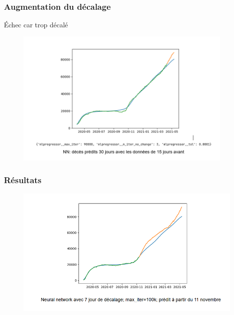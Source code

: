 \documentclass{beamer}
\begin{document}
\begin{frame}
	\frametitle{Augmentation du décalage}
	Échec car trop décalé
	\begin{figure}
		\includegraphics[width=0.95\textwidth]{NN_2}
	\end{figure}
\end{frame}




\begin{frame}
	\frametitle{Résultats}
	\begin{figure}[h]
		\centering
		\includegraphics[width=\textwidth]{NN_1}
	\end{figure}
\end{frame}
\end{document}

